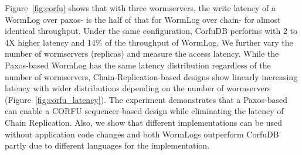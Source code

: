 Figure~\ref{fig:corfu} shows that with three wormservers, the write latency of a WormLog over paxos-\WOR{} is the half of that for WormLog over chain-\WOR{} for almost identical throughput. Under the same configuration, CorfuDB performs with 2 to 4X higher latency and 14\% of the throughput of WormLog. We further vary the number of wormservers (replicas) and measure the access latency. While the Paxos-based WormLog has the same latency distribution regardless of the number of wormservers, Chain-Replication-based designs show linearly increasing latency with wider distributions depending on the number of wormservers (Figure~\ref{fig:corfu_latency}). The experiment demonstrates that a Paxos-based \wormspace{} can enable a CORFU sequencer-based design while eliminating the latency of Chain Replication. Also, we show that different \WOR{} implementations can be used without application code changes and both WormLogs outperform CorfuDB partly due to different languages for the implementation.






